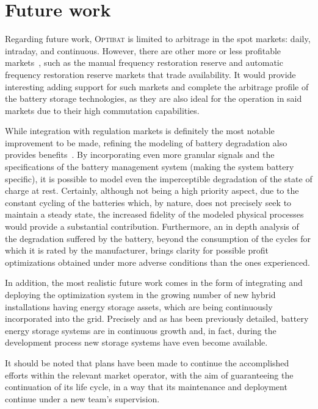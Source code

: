\section{Future work}
\label{makereference10.2}

Regarding future work, \textsc{Optibat} is limited to arbitrage in the spot markets: daily, intraday, and continuous. However, there are other more or less profitable markets~\cite{cnmc2024balance}, such as the manual frequency restoration reserve and automatic frequency restoration reserve markets that trade availability. It would provide interesting adding support for such markets and complete the arbitrage profile of the battery storage technologies, as they are also ideal for the operation in said markets due to their high commutation capabilities.

While integration with regulation markets is definitely the most notable improvement to be made, refining the modeling of battery degradation also provides benefits~\cite{shamarova2022review}. By incorporating even more granular signals and the specifications of the battery management system (making the system battery specific), it is possible to model even the imperceptible degradation of the state of charge at rest. Certainly, although not being a high priority aspect, due to the constant cycling of the batteries which, by nature, does not precisely seek to maintain a steady state, the increased fidelity of the modeled physical processes would provide a substantial contribution. Furthermore, an in depth analysis of the degradation suffered by the battery, beyond the consumption of the cycles for which it is rated by the manufacturer, brings clarity for possible profit optimizations obtained under more adverse conditions than the ones experienced.

In addition, the most realistic future work comes in the form of integrating and deploying the optimization system in the growing number of new hybrid installations having energy storage assets, which are being continuously incorporated into the grid. Precisely and as has been previously detailed, battery energy storage systems are in continuous growth and, in fact, during the development process new storage systems have even become available.

It should be noted that plans have been made to continue the accomplished efforts within the relevant market operator, with the aim of guaranteeing the continuation of its life cycle, in a way that its maintenance and deployment continue under a new team's supervision.
